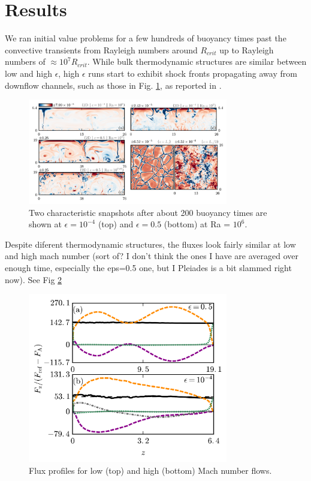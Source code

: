 \documentclass[aps, prl, twocolumn, groupedaddress]{revtex4-1}
\begin{document}
\section{Results \label{section:results}}
We ran initial value problems for a few hundreds of buoyancy times past the convective transients from 
Rayleigh numbers around $R_{crit}$ up to Rayleigh numbers of $\approx 10^7 R_{crit}$.  While bulk thermodynamic
structures are similar between low and high $\epsilon$, high $\epsilon$ runs start to exhibit shock fronts
propagating away from downflow channels, such as those in Fig. \ref{fig:entropy_snapshots}, as reported in \cite{cattaneo&all1990}.
\begin{figure}[t]
\includegraphics[width=3.4375in]{./figs/snapshots_fig.png}
\caption{Two characteristic snapshots after about 200 buoyancy times are shown at $\epsilon=10^{-4}$ (top)
and $\epsilon=0.5$ (bottom) at Ra = $10^6$.  
\label{fig:entropy_snapshots} }
\end{figure}

Despite diferent thermodynamic structures, the fluxes look fairly similar at low and high mach number (sort of?
I don't think the ones I have are averaged over enough time, especially the eps=0.5 one, but I Pleiades is
a bit slammed right now).  See Fig \ref{fig:flux_profiles}

\begin{figure}[b]
\includegraphics[width=3.4375in]{./figs/fluxes_fig.png}
\caption{Flux profiles for low (top) and high (bottom) Mach number flows.  
\label{fig:flux_profiles} }
\end{figure}
\end{document}
